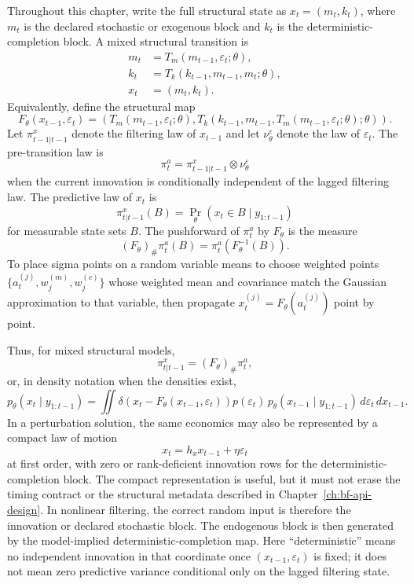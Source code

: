 \begin{definition}
\label{def:bf-structural-transition-notation}
Throughout this chapter, write the full structural state as
$x_t=(m_t,k_t)$, where $m_t$ is the declared stochastic or exogenous block and
$k_t$ is the deterministic-completion block.  A mixed structural transition is
\begin{align}
  m_t &= T_m(m_{t-1}, \varepsilon_t; \theta), \label{eq:bf-m-transition}\\
  k_t &= T_k(k_{t-1}, m_{t-1}, m_t; \theta), \label{eq:bf-k-transition}\\
  x_t &= (m_t, k_t).
\end{align}
Equivalently, define the structural map
\begin{equation}
  F_\theta(x_{t-1},\varepsilon_t)
  =
  \left(
    T_m(m_{t-1},\varepsilon_t;\theta),
    T_k(k_{t-1},m_{t-1},
      T_m(m_{t-1},\varepsilon_t;\theta);\theta)
  \right).
  \label{eq:bf-structural-map-definition}
\end{equation}
Let $\pi_{t-1|t-1}^x$ denote the filtering law of $x_{t-1}$ and let
$\nu_\theta^\varepsilon$ denote the law of $\varepsilon_t$.  The pre-transition
law is
\begin{equation}
  \pi_t^a = \pi_{t-1|t-1}^x \otimes \nu_\theta^\varepsilon
\end{equation}
when the current innovation is conditionally independent of the lagged
filtering law.  The predictive law of $x_t$ is
\[
  \pi_{t|t-1}^x(B)
  =
  \Pr_\theta(x_t\in B\mid y_{1:t-1})
\]
for measurable state sets $B$.  The pushforward of $\pi_t^a$ by $F_\theta$ is
the measure
\[
  (F_\theta)_\#\pi_t^a(B)
  =
  \pi_t^a\!\left(F_\theta^{-1}(B)\right).
\]
To place sigma points on a random variable means to choose weighted points
$\{a_t^{(j)},w_j^{(m)},w_j^{(c)}\}$ whose weighted mean and covariance match
the Gaussian approximation to that variable, then propagate
$x_t^{(j)}=F_\theta(a_t^{(j)})$ point by point.
\end{definition}

Thus, for mixed structural models,
\[
  \pi_{t|t-1}^x = (F_\theta)_\#\pi_t^a,
\]
or, in density notation when the densities exist,
\[
  p_\theta(x_t\mid y_{1:t-1})
  =
  \iint \delta\!\left(x_t - F_\theta(x_{t-1},\varepsilon_t)\right)
  p(\varepsilon_t)\,p_\theta(x_{t-1}\mid y_{1:t-1})
  \, d\varepsilon_t \, dx_{t-1}.
\]
In a perturbation solution, the same economics may also be represented by a
compact law of motion
\[
  x_t = h_x x_{t-1} + \eta \varepsilon_t
\]
at first order, with zero or rank-deficient innovation rows for the
deterministic-completion block.  The compact representation is useful, but it
must not erase the timing contract or the structural metadata described in
Chapter~\ref{ch:bf-api-design}.
In nonlinear filtering, the correct random input is therefore the innovation or
declared stochastic block.  The endogenous block is then generated by the
model-implied deterministic-completion map.  Here ``deterministic'' means no
independent innovation in that coordinate once $(x_{t-1},\varepsilon_t)$ is
fixed; it does not mean zero predictive variance conditional only on the lagged
filtering state.

